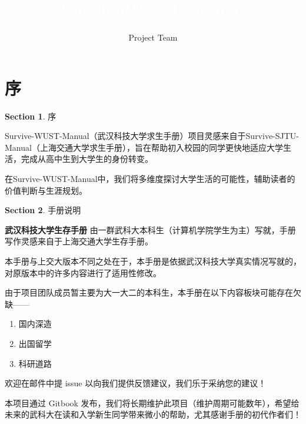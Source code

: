 \documentclass{beamer}	%
\title{\textcolor{white}{SurviveWUSTManual}}
\author{Project Team}
\date{\time}
\theoremstyle{plain}
\theoremstyle{definition}
\newtheorem{se}{Section}[section]
\theoremstyle{remark}
\numberwithin{equation}{section}
\begin{document}
\begin{frame}
\titlepage
\end{frame}



\section{序}



\begin{frame}

	\begin{se}
		序
	\end{se}

	Survive-WUST-Manual（武汉科技大学求生手册）项目灵感来自于Survive-SJTU-Manual（上海交通大学求生手册），旨在帮助初入校园的同学更快地适应大学生活，完成从高中生到大学生的身份转变。

在Survive-WUST-Manual中，我们将多维度探讨大学生活的可能性，辅助读者的价值判断与生涯规划。
	

\end{frame}

\begin{frame}
	\begin{se}
		手册说明
	\end{se}
	\textbf{武汉科技大学生存手册}
	由一群武科大本科生（计算机学院学生为主）写就，手册写作灵感来自于上海交通大学生存手册。
	\vspace{\baselineskip}
	
	本手册与上交大版本不同之处在于，本手册是依据武汉科技大学真实情况写就的，对原版本中的许多内容进行了适用性修改。

	\vspace{\baselineskip}
	由于项目团队成员暂主要为大一大二的本科生，本手册在以下内容板块可能存在欠缺——
	\begin{enumerate}
		\item 国内深造
		\item 出国留学
		\item 科研道路
	\end{enumerate}

\end{frame}

\begin{frame}
	欢迎在邮件中提 issue 以向我们提供反馈建议，我们乐于采纳您的建议！
	
	\vspace{\baselineskip}
	
	本项目通过 Gitbook 发布，我们将长期维护此项目（维护周期可能数年），希望给未来的武科大在读和入学新生同学带来微小的帮助，尤其感谢手册的初代作者们！
\end{frame}
\end{document}
